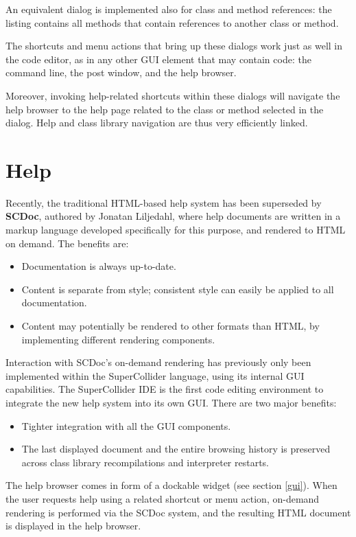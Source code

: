 \documentclass[11pt,a4paper]{article}
\begin{document}
An equivalent dialog is implemented also for class and method references: the listing contains
all methods that contain references to another class or method.

The shortcuts and menu actions that bring up these dialogs work just as well in the code editor,
as in any other GUI element that may contain code: the command line, the post window, and the help
browser.

Moreover, invoking help-related shortcuts within these dialogs will navigate the help browser to the
help page related to the class or method selected in the dialog. Help and class library navigation
are thus very efficiently linked.

\section{Help}

Recently, the traditional HTML-based help system has been superseded by \textbf{SCDoc}, authored by
Jonatan Liljedahl, where help documents are written in a markup language developed specifically
for this purpose, and rendered to HTML on demand. The benefits are:
\begin{itemize}
 \item Documentation is always up-to-date.
 \item Content is separate from style; consistent style can easily be applied to all documentation.
 \item Content may potentially be rendered to other formats than HTML, by implementing different
rendering components.
\end{itemize}

Interaction with SCDoc's on-demand rendering has previously only been implemented within the SuperCollider language,
using its internal GUI capabilities. The SuperCollider IDE is the first code editing environment to integrate the new
help system into its own GUI. There are two major benefits:
\begin{itemize}
 \item Tighter integration with all the GUI components.
 \item The last displayed document and the entire browsing history is preserved across class library recompilations and
interpreter restarts.
\end{itemize}

The help browser comes in form of a dockable widget (see section \ref{gui}). When the user requests help using a related
shortcut or menu action, on-demand rendering is performed via the SCDoc system, and the resulting HTML document is
displayed in the help browser.
\end{document}
